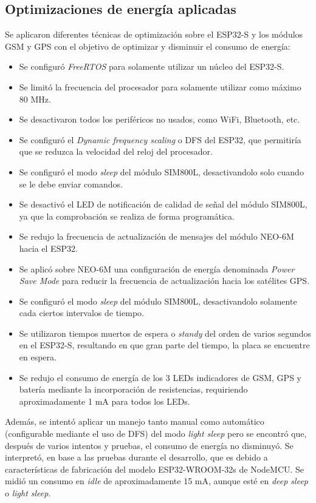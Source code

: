 \subsection{Optimizaciones de energía aplicadas}

Se aplicaron diferentes técnicas de optimización sobre el ESP32-S y los módulos GSM y GPS con el objetivo de optimizar y disminuir el consumo de energía:
\begin{itemize}
	\item Se configuró \textit{FreeRTOS} para solamente utilizar un núcleo del ESP32-S.
	\item Se limitó la frecuencia del procesador para solamente utilizar como máximo 80 MHz.
	\item Se desactivaron todos los periféricos no usados, como WiFi, Bluetooth, etc.
	\item Se configuró el \textit{Dynamic frequency scaling} o DFS del ESP32, que permitiría que se reduzca la velocidad del reloj del procesador\citep{ESP32:2}.
	\item Se configuró el modo \textit{sleep} del módulo SIM800L, desactivandolo solo cuando se le debe enviar comandos.
	\item Se desactivó el LED de notificación de calidad de señal del módulo SIM800L, ya que la comprobación se realiza de forma programática.
	\item Se redujo la frecuencia de actualización de mensajes del módulo NEO-6M hacia el ESP32.
	\item Se aplicó sobre NEO-6M una configuración de energía denominada \textit{Power Save Mode} para reducir la frecuencia de actualización hacia los satélites GPS\citep{NEO6M:2}.
	\item Se configuró el modo \textit{sleep} del módulo SIM800L, desactivandolo solamente cada ciertos intervalos de tiempo.
	\item Se utilizaron tiempos muertos de espera o \textit{standy} del orden de varios segundos en el ESP32-S, resultando en que gran parte del tiempo, la placa se encuentre en espera.
	\item Se redujo el consumo de energía de los 3 LEDs indicadores de GSM, GPS y batería mediante la incorporación de resistencias, requiriendo aproximadamente 1 mA para todos los LEDs.
\end{itemize}

Además, se intentó aplicar un manejo tanto manual como automático (configurable mediante el uso de DFS) del modo \textit{light sleep} pero se encontró que, después de varios intentos y pruebas, el consumo de energía no disminuyó. Se interpretó, en base a las pruebas durante el desarrollo, que es debido a características de fabricación del modelo ESP32-WROOM-32s de NodeMCU. Se midió un consumo en \textit{idle} de aproximadamente 15 mA, aunque esté en \textit{deep sleep} o \textit{light sleep}.

